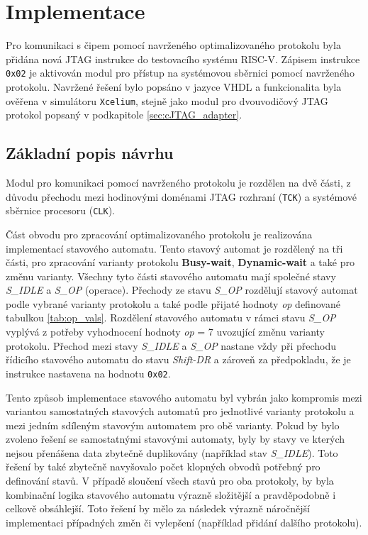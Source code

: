 \section{Implementace}
Pro komunikaci s čipem pomocí navrženého optimalizovaného protokolu byla přidána nová \acs{JTAG} instrukce do testovacího systému \acs{RISC-V}. Zápisem instrukce \texttt{0x02} je aktivován modul pro přístup na systémovou sběrnici pomocí navrženého protokolu. Navržené řešení bylo popsáno v jazyce \acs{VHDL} a funkcionalita byla ověřena v simulátoru \texttt{Xcelium}, stejně jako modul pro dvouvodičový \acs{JTAG} protokol popsaný v podkapitole \ref{sec:cJTAG_adapter}.

\subsection{Základní popis návrhu}	\label{subsec:jtag_ap_impl}
Modul pro komunikaci pomocí navrženého protokolu je rozdělen na dvě části, z důvodu přechodu mezi hodinovými doménami \acs{JTAG} rozhraní (\texttt{\acs{TCK}}) a systémové sběrnice procesoru (\texttt{CLK}).

Část obvodu pro zpracování optimalizovaného protokolu je realizována implementací stavového automatu. Tento stavový automat je rozdělený na tři části, pro zpracování varianty protokolu \textbf{Busy-wait}, \textbf{Dynamic-wait} a také pro změnu varianty. Všechny tyto části stavového automatu mají společné stavy \textit{S\_IDLE} a \textit{S\_OP} (operace). Přechody ze stavu \textit{S\_OP} rozdělují stavový automat podle vybrané varianty protokolu a také podle přijaté hodnoty \textit{op} definované tabulkou \ref{tab:op_vals}. Rozdělení stavového automatu v rámci stavu \textit{S\_OP} vyplývá z potřeby vyhodnocení hodnoty \textit{op} = 7 uvozující změnu varianty protokolu. Přechod mezi stavy \textit{S\_IDLE} a \textit{S\_OP} nastane vždy při přechodu řídicího stavového automatu do stavu \textit{Shift-DR} a zároveň za předpokladu, že je instrukce nastavena na hodnotu \texttt{0x02}.

Tento způsob implementace stavového automatu byl vybrán jako kompromis mezi variantou samostatných stavových automatů pro jednotlivé varianty protokolu a mezi jedním sdíleným stavovým automatem pro obě varianty. Pokud by bylo zvoleno řešení se samostatnými stavovými automaty, byly by stavy ve kterých nejsou přenášena data zbytečně duplikovány (například stav \textit{S\_IDLE}). Toto řešení by také zbytečně navyšovalo počet klopných obvodů potřebný pro definování stavů. V případě sloučení všech stavů pro oba protokoly, by byla kombinační logika stavového automatu výrazně složitější a pravděpodobně i celkově obsáhlejší. Toto řešení by mělo za následek výrazně náročnější implementaci případných změn či vylepšení (například přidání dalšího protokolu). 

